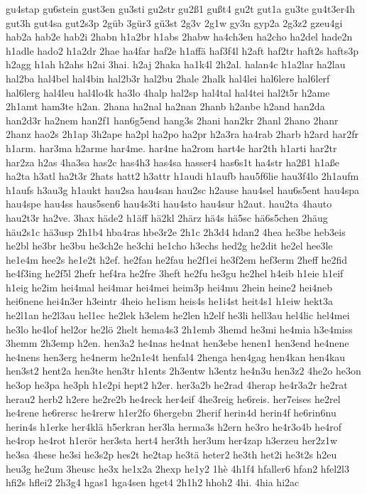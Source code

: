 {gu4stap
gu6stein
gust3en
gu3sti
gu2str
gu2ß1
gußt4
gu2t
gut1a
gu3te
gu4t3er4h
gut3h
gut4sa
gut2s3p
2güb
3gür3
gü3st
2g3v
2g1w
gy3n
gyp2a
2g3z2
gzeu4gi
hab2a
hab2e
hab2i
2habn
h1a2br
h1abs
2habw
ha4ch3en
ha2cho
ha2del
hade2n
h1adle
hado2
h1a2dr
2hae
ha4far
haf2e
h1affä
haf3f4l
h2aft
haf2tr
haft2s
hafts3p
h2agg
h1ah
h2ahs
h2ai
3hai.
h2aj
2haka
ha1k4l
2h2al.
halan4c
h1a2lar
ha2lau
hal2ba
hal4bel
hal4bin
hal2b3r
hal2bu
2hale
2halk
hal4lei
hal6lere
hal6lerf
hal6lerg
hal4leu
hal4lo4k
ha3lo
4halp
hal2sp
hal4tal
hal4tei
hal2t5r
h2ame
2h1amt
ham3te
h2an.
2hana
ha2nal
ha2nan
2hanb
h2anbe
h2and
han2da
han2d3r
ha2nem
han2f1
han6g5end
hang3s
2hani
han2kr
2hanl
2hano
2hanr
2hanz
hao2s
2h1ap
3h2ape
ha2pl
ha2po
ha2pr
h2a3ra
ha4rab
2harb
h2ard
har2fr
h1arm.
har3ma
h2arme
har4me.
har4ne
ha2rom
hart4e
har2th
h1arti
har2tr
har2za
h2as
4ha3sa
has2c
has4h3
has4sa
hasser4
has6s1t
ha4str
ha2ß1
h1aße
ha2ta
h3atl
ha2t3r
2hats
hatt2
h3attr
h1audi
h1aufb
hau5f6lie
hau3f4lo
2h1aufm
h1aufs
h3au3g
h1aukt
hau2sa
hau4san
hau2sc
h2ause
hau4sel
hau6s5ent
hau4spa
hau4spe
hau4ss
haus5sen6
hau4s3ti
hau4sto
hau4sur
h2aut.
hau2ta
4hauto
hau2t3r
ha2ve.
3hax
häde2
h1äff
hä2kl
2härz
hä4s
hä5sc
hä6s5chen
2häug
häu2s1c
hä3usp
2h1b4
hba4ras
hbe3r2e
2h1c
2h3d4
hdan2
4hea
he3be
heb3eis
he2bl
he3br
he3bu
he3ch2e
he3chi
he1cho
h3echs
hed2g
he2dit
he2el
hee3le
he1e4m
hee2s
he1e2t
h2ef.
he2fan
he2fau
he2f1ei
he3f2em
hef3erm
2heff
he2fid
he4f3ing
he2f5l
2hefr
hef4ra
he2fre
3heft
he2fu
he3gu
he2hel
h4eib
h1eie
h1eif
h1eig
he2im
hei4mal
hei4mar
hei4mei
heim3p
hei4mu
2hein
heine2
hei4neb
hei6nene
hei4n3er
h3eintr
4heio
he1ism
heis4s
he1i4st
heit4s1
h1eiw
hekt3a
he2l1an
he2l3au
hel1ec
he2lek
h3elem
he2len
h2elf
he3li
hell3au
hel4lic
hel4mei
he3lo
he4lof
hel2or
he2lö
2helt
hema4s3
2h1emb
3hemd
he3mi
he4mia
h3e4miss
3hemm
2h3emp
h2en.
hen3a2
he4nas
he4nat
hen3ebe
henen1
hen3end
he4nene
he4nens
hen3erg
he4nerm
he2n1e4t
henfal4
2henga
hen4gag
hen4kan
hen4kau
hen3st2
hent2a
hen3te
hen3tr
h1ents
2h3entw
h3entz
he4n3u
hen3z2
4he2o
he3on
he3op
he3pa
he3ph
h1e2pi
hept2
h2er.
her3a2b
he2rad
4herap
he4r3a2r
he2rat
herau2
herb2
h2ere
he2re2b
he4reck
her4eif
4he3reig
he6reis.
her7eises
he2rel
he4rene
he6rersc
he4rerw
h1er2fo
6hergebn
2herif
herin4d
herin4f
he6rin6nu
herin4s
h1erke
her4klä
h5erkran
her3la
herma3s
h2ern
he3ro
he4r3o4b
he4rof
he4rop
he4rot
h1erör
her3sta
hert4
her3th
her3um
her4zap
h3erzeu
her2z1w
he3sa
4hese
he3si
he3s2p
hes2t
he2tap
he3tä
heter2
he3th
het2i
he3t2s
h2eu
heu3g
he2um
3heusc
he3x
he1x2a
2hexp
he1y2
1hè
4h1f4
hfaller6
hfan2
hfel2l3
hfi2s
hflei2
2h3g4
hgas1
hga4sen
hget4
2h1h2
hhoh2
4hi.
4hia
hi2ac
}
